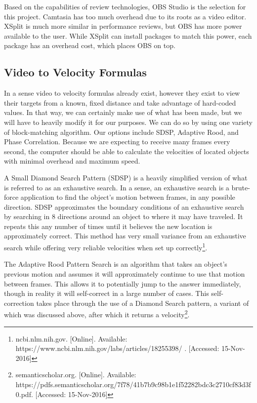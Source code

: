 \documentclass[letterpaper,10pt,onecolumn,draftclsnofoot]{IEEEtran}
\begin{document}
Based on the capabilities of review technologies, OBS Studio is the selection for this project.  Camtasia has too much overhead due to its roots as a video editor.  XSplit is much more similar in performance reviews, but OBS has more power available to the user.  While XSplit can install packages to match this power, each package has an overhead cost, which places OBS on top.

\newpage
\subsection{Video to Velocity Formulas} %

In a sense video to velocity formulas already exist, however they exist to view their targets from a known, fixed distance and take advantage of hard-coded values.  In that way, we can certainly make use of what has been made, but we will have to heavily modify it for our purposes.  We can do so by using one variety of block-matching algorithm.  Our options include SDSP, Adaptive Rood, and Phase Correlation.  Because we are expecting to receive many frames every second, the computer should be able to calculate the velocities of located objects with minimal overhead and maximum speed.

A Small Diamond Search Pattern (SDSP) is a heavily simplified version of what is referred to as an exhaustive search.  In a sense, an exhaustive search is a brute-force application to find the object's motion between frames, in any possible direction.  SDSP approximates the boundary conditions of an exhaustive search by searching in 8 directions around an object to where it may have traveled.  It repeats this any number of times until it believes the new location is approximately correct.  This method has very small variance from an exhaustive search while offering very reliable velocities when set up correctly\footnote{ncbi.nlm.nih.gov. [Online]. Available: https://www.ncbi.nlm.nih.gov/labs/articles/18255398/ . [Accessed: 15-Nov-2016] }.

The Adaptive Rood Pattern Search is an algorithm that takes an object's previous motion and assumes it will approximately continue to use that motion between frames.  This allows it to potentially jump to the answer immediately, though in reality it will self-correct in a large number of cases.  This self-correction takes place through the use of a Diamond Search pattern, a variant of which was discussed above, after which it returns a velocity\footnote{semanticscholar.org. [Online]. Available: https://pdfs.semanticscholar.org/7f78/41b7b9c98b1e1f52282bdc3c2710cf83d3f0.pdf. [Accessed: 15-Nov-2016] }.
\end{document}
